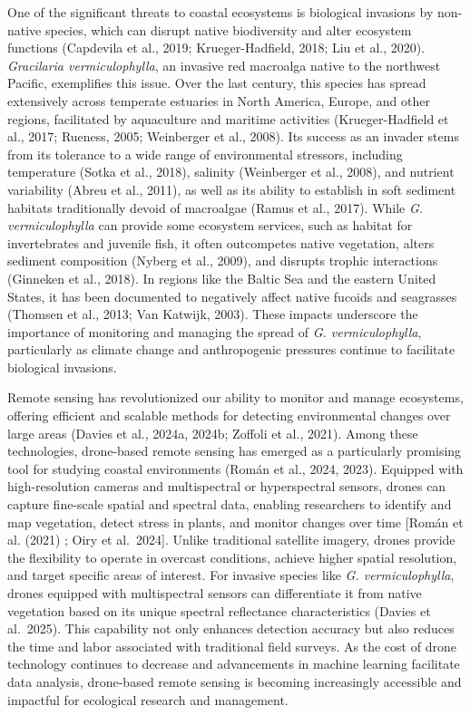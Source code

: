 \documentclass[
  letterpaper,
  DIV=11,
  numbers=noendperiod]{scrartcl}
\begin{document}
One of the significant threats to coastal ecosystems is biological
invasions by non-native species, which can disrupt native biodiversity
and alter ecosystem functions (Capdevila et al., 2019; Krueger-Hadfield,
2018; Liu et al., 2020). \emph{Gracilaria vermiculophylla}, an invasive
red macroalga native to the northwest Pacific, exemplifies this issue.
Over the last century, this species has spread extensively across
temperate estuaries in North America, Europe, and other regions,
facilitated by aquaculture and maritime activities (Krueger-Hadfield et
al., 2017; Rueness, 2005; Weinberger et al., 2008). Its success as an
invader stems from its tolerance to a wide range of environmental
stressors, including temperature (Sotka et al., 2018), salinity
(Weinberger et al., 2008), and nutrient variability (Abreu et al.,
2011), as well as its ability to establish in soft sediment habitats
traditionally devoid of macroalgae (Ramus et al., 2017). While \emph{G.
vermiculophylla} can provide some ecosystem services, such as habitat
for invertebrates and juvenile fish, it often outcompetes native
vegetation, alters sediment composition (Nyberg et al., 2009), and
disrupts trophic interactions (Ginneken et al., 2018). In regions like
the Baltic Sea and the eastern United States, it has been documented to
negatively affect native fucoids and seagrasses (Thomsen et al., 2013;
Van Katwijk, 2003). These impacts underscore the importance of
monitoring and managing the spread of \emph{G. vermiculophylla},
particularly as climate change and anthropogenic pressures continue to
facilitate biological invasions.

Remote sensing has revolutionized our ability to monitor and manage
ecosystems, offering efficient and scalable methods for detecting
environmental changes over large areas (Davies et al., 2024a, 2024b;
Zoffoli et al., 2021). Among these technologies, drone-based remote
sensing has emerged as a particularly promising tool for studying
coastal environments (Román et al., 2024, 2023). Equipped with
high-resolution cameras and multispectral or hyperspectral sensors,
drones can capture fine-scale spatial and spectral data, enabling
researchers to identify and map vegetation, detect stress in plants, and
monitor changes over time {[}Román et al. (2021) ; Oiry et al.~2024{]}.
Unlike traditional satellite imagery, drones provide the flexibility to
operate in overcast conditions, achieve higher spatial resolution, and
target specific areas of interest. For invasive species like \emph{G.
vermiculophylla}, drones equipped with multispectral sensors can
differentiate it from native vegetation based on its unique spectral
reflectance characteristics (Davies et al.~2025). This capability not
only enhances detection accuracy but also reduces the time and labor
associated with traditional field surveys. As the cost of drone
technology continues to decrease and advancements in machine learning
facilitate data analysis, drone-based remote sensing is becoming
increasingly accessible and impactful for ecological research and
management.
\end{document}
